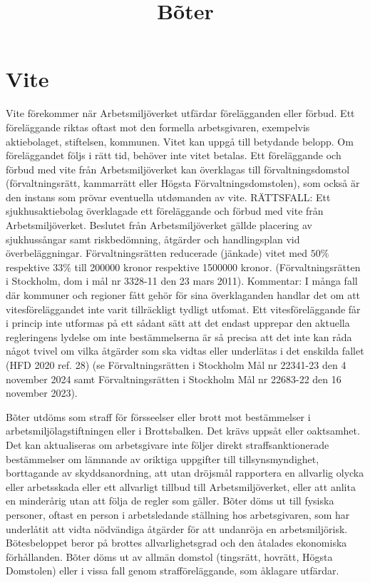 \section*{Vite}
Vite förekommer när Arbetsmiljöverket utfärdar förelägganden eller förbud. Ett föreläggande riktas oftast mot den formella arbetsgivaren, exempelvis aktiebolaget, stiftelsen, kommunen. Vitet kan uppgå till betydande belopp. Om föreläggandet följs i rätt tid, behöver inte vitet betalas. Ett föreläggande och förbud med vite från Arbetsmiljöverket kan överklagas till förvaltningsdomstol (förvaltningsrätt, kammarrätt eller Högsta Förvaltningsdomstolen), som också är den instans som prövar eventuella utdømanden av vite.
RÄTTSFALL: Ett sjukhusaktiebolag överklagade ett föreläggande och förbud med vite från Arbetsmiljöverket. Beslutet från Arbetsmiljöverket gällde placering av sjukhussångar samt riskbedömning, åtgärder och handlingsplan vid överbeläggningar. Förvaltningsrätten reducerade (jänkade) vitet med \(50 \%\) respektive \(33 \%\) till 200000 kronor respektive 1500000 kronor.
(Förvaltningsrätten i Stockholm, dom i mål nr 3328-11 den 23 mars 2011).
Kommentar: I många fall där kommuner och regioner fått gehör för sina överklaganden handlar det om att vitesföreläggandet inte varit tillräckligt tydligt utfomat. Ett vitesföreläggande får i princip inte utformas på ett sådant sätt att det endast upprepar den aktuella regleringens lydelse om inte bestämmelserna är så precisa att det inte kan råda något tvivel om vilka åtgärder som ska vidtas eller underlätas i det enskilda fallet (HFD 2020 ref. 28) (se Förvaltningsrätten i Stockholm Mål nr 22341-23 den 4 november 2024 samt Förvaltningsrätten i Stockholm Mål nr 22683-22 den 16 november 2023).

\title{
Bõter
}
Bõter utdöms som straff för försseelser eller brott mot bestämmelser i arbetsmiljölagstiftningen eller i Brottsbalken. Det krävs uppsåt eller oaktsamhet. Det kan aktualiseras om arbetsgivare inte följer direkt straffsanktionerade bestämmelser om lämnande av oriktiga uppgifter till tillsynsmyndighet, borttagande av skyddsanordning, att utan dröjsmål rapportera en allvarlig olycka eller arbetsskada eller ett allvarligt tillbud till Arbetsmiljöverket, eller att anlita en minderårig utan att följa de regler som gäller.
Bõter döms ut till fysiska personer, oftast en person i arbetsledande ställning hos arbetsgivaren, som har underlåtit att vidta nödvändiga åtgärder för att undanröja en arbetsmiljörisk. Bötesbeloppet beror på brottes allvarlighetsgrad och den åtalades ekonomiska förhållanden. Bõter döms ut av allmän domstol (tingsrätt, hovrätt, Högsta Domstolen) eller i vissa fall genom strafföreläggande, som åklagare utfärdar.
